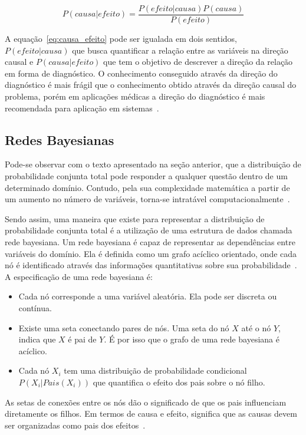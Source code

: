\begin{equation}
    \label{eq:causa_efeito}
    P(causa|efeito) = \frac{P(efeito|causa)P(causa)}{P(efeito)}
\end{equation}

A equação~\ref{eq:causa_efeito} pode ser igualada em dois sentidos, $P(efeito|causa)$ que busca quantificar a relação entre as variáveis na direção causal e $P(causa|efeito)$ que tem o objetivo de descrever a direção da relação em forma de diagnóstico. O conhecimento conseguido através da direção do diagnóstico é mais frágil que o conhecimento obtido através da direção causal do problema, porém em aplicações médicas a direção do diagnóstico é mais recomendada para aplicação em sistemas~\cite{russell:2002}.

\subsection{Redes Bayesianas}
\label{sec:redes-bayesianas}
Pode-se observar com o texto apresentado na seção anterior, que a distribuição de probabilidade conjunta total pode responder a qualquer questão dentro de um determinado domínio. Contudo, pela sua complexidade matemática a partir de um aumento no número de variáveis, torna-se intratável computacionalmente~\cite{russell:2002}.

Sendo assim, uma maneira que existe para representar a distribuição de probabilidade conjunta total é a utilização de uma estrutura de dados chamada rede bayesiana. Um rede bayesiana é capaz de representar as dependências entre variáveis do domínio. Ela é definida como um grafo acíclico orientado, onde cada nó é identificado através das informações quantitativas sobre sua probabilidade~\cite{russell:2002}. A especificação de uma rede bayesiana é:

\begin{itemize}
    \item Cada nó corresponde a uma variável aleatória. Ela pode ser discreta ou contínua.
    \item Existe uma seta conectando pares de nós. Uma seta do nó $X$ até o nó $Y$, indica que $X$ é pai de $Y$. É por isso que o grafo de uma rede bayesiana é acíclico.
    \item Cada nó $X_i$ tem uma distribuição de probabilidade condicional $P(X_i|Pais(X_i))$ que quantifica o efeito dos pais sobre o nó filho.
\end{itemize}

As setas de conexões entre os nós dão o significado de que os pais influenciam diretamente os filhos. Em termos de causa e efeito, significa que as causas devem ser organizadas como pais dos efeitos~\cite{russell:2002}.

